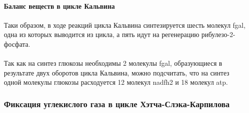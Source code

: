 


\paragraph{Баланс веществ в цикле Кальвина}

\paragraph*{}Таки образом, в ходе реакций цикла Кальвина синтезируется шесть молекул \gls{fgal}, одна из которых выводится из цикла, а пять идут на регенерацию рибулезо-2-фосфата.  

\paragraph*{}Так как на синтез глюкозы необходимы 2 молекулы \gls{fgal}, образующиеся в результате двух оборотов цикла Кальвина, можно подсчитать, что на синтез одной молекулы глюкозы расходуется 12 молекул \gls{nadfh2} и 18 молекул \gls{atp}.

\subsubsection*{Фиксация углекислого газа в цикле Хэтча-Слэка-Карпилова}


